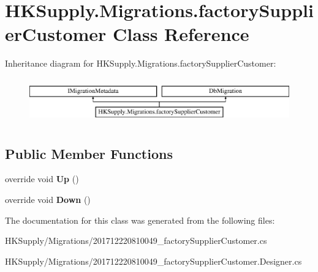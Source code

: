 \hypertarget{class_h_k_supply_1_1_migrations_1_1factory_supplier_customer}{}\section{H\+K\+Supply.\+Migrations.\+factory\+Supplier\+Customer Class Reference}
\label{class_h_k_supply_1_1_migrations_1_1factory_supplier_customer}
Inheritance diagram for H\+K\+Supply.\+Migrations.\+factory\+Supplier\+Customer\+:\begin{figure}[H]
\begin{center}
\leavevmode
\includegraphics[height=1.978799cm]{class_h_k_supply_1_1_migrations_1_1factory_supplier_customer}
\end{center}
\end{figure}
\subsection*{Public Member Functions}
\begin{DoxyCompactItemize}
\item 
\mbox{\label{class_h_k_supply_1_1_migrations_1_1factory_supplier_customer_a89b88b67475246d96aa21d7e72494e8a}} 
override void {\bfseries Up} ()
\item 
\mbox{\label{class_h_k_supply_1_1_migrations_1_1factory_supplier_customer_acc9fa1a0cb97846f4f16d07d452cf6b1}} 
override void {\bfseries Down} ()
\end{DoxyCompactItemize}


The documentation for this class was generated from the following files\+:\begin{DoxyCompactItemize}
\item 
H\+K\+Supply/\+Migrations/201712220810049\+\_\+factory\+Supplier\+Customer.\+cs\item 
H\+K\+Supply/\+Migrations/201712220810049\+\_\+factory\+Supplier\+Customer.\+Designer.\+cs\end{DoxyCompactItemize}

